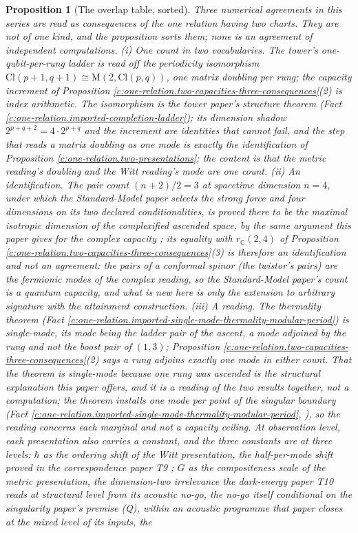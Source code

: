 \documentclass[11pt]{article}
\newtheorem{proposition}[theorem]{Proposition}
\theoremstyle{definition}
\theoremstyle{plain}
\newcommand{\changedmark}[2]{\marginpar{\raggedright\scriptsize\color{#1}#2}}
\providecommand{\C}{}\renewcommand{\C}{\mathbb{C}}
\providecommand{\Cl}{}\renewcommand{\Cl}{\mathrm{Cl}}
\providecommand{\Mat}{}\renewcommand{\Mat}{\mathrm{M}}
\begin{document}
\begin{proposition}[The overlap table, sorted]\label{c:one-relation.overlap-table-sorted}
\changedmark{gray}{reworded}
Three numerical agreements in this series are read as consequences of the one relation having two charts. They are not of one kind, and the proposition sorts them; none is an agreement of independent computations. \emph{(i) One count in two vocabularies.} The tower's one-qubit-per-rung ladder is read off the periodicity isomorphism $\Cl(p+1,q+1) \cong \Mat(2, \Cl(p,q))$, one matrix doubling per rung; the capacity increment of Proposition \ref{c:one-relation.two-capacities-three-consequences}(2) is index arithmetic. The isomorphism is the tower paper's structure theorem (Fact \ref{c:one-relation.imported-completion-ladder}); its dimension shadow $2^{p+q+2} = 4 \cdot 2^{p+q}$ and the increment are identities that cannot fail, and the step that reads a matrix doubling as one mode is exactly the identification of Proposition \ref{c:one-relation.two-presentations}; the content is that the metric reading's doubling and the Witt reading's mode are one count. \emph{(ii) An identification.} The pair count $(n+2)/2 = 3$ at spacetime dimension $n = 4$, under which the Standard-Model paper selects the strong force and four dimensions on its two declared conditionalities, is proved there to be the maximal isotropic dimension of the complexified ascended space, by the same argument this paper gives for the complex capacity \cite[Lem.~2.12]{ButlerT12}; its equality with $r_{\C}(2,4)$ of Proposition \ref{c:one-relation.two-capacities-three-consequences}(3) is therefore an identification and not an agreement: the pairs of a conformal spinor (the twistor's pairs) are the fermionic modes of the complex reading, so the Standard-Model paper's count is a quantum capacity, and what is new here is only the extension to arbitrary signature with the attainment construction. \emph{(iii) A reading.} The thermality theorem (Fact \ref{c:one-relation.imported-single-mode-thermality-modular-period}) is single-mode, its mode being the ladder pair of the ascent, a mode adjoined by the rung and not the boost pair of $(1,3)$; Proposition \ref{c:one-relation.two-capacities-three-consequences}(2) says a rung adjoins exactly one mode in either count. That the theorem is single-mode \emph{because} one rung was ascended is the structural explanation this paper offers, and it is a reading of the two results together, not a computation; the theorem installs one mode per point of the singular boundary (Fact \ref{c:one-relation.imported-single-mode-thermality-modular-period}, \cite[Thm.~8.12]{ButlerT4}), so the reading concerns each marginal and not a capacity ceiling. At observation level, each presentation also carries a constant, and the three constants are at three levels: $\hbar$ as the ordering shift of the Witt presentation, the half-per-mode shift proved in the correspondence paper T9 \cite[Prop.~5.6]{ButlerT9}; $G$ as the compositeness scale of the metric presentation, the dimension-two irrelevance the dark-energy paper T10 reads at structural level from its acoustic no-go, the no-go itself conditional on the singularity paper's premise (Q), within an acoustic programme that paper closes at the mixed level of its inputs, the 
\end{proposition}
\end{document}
